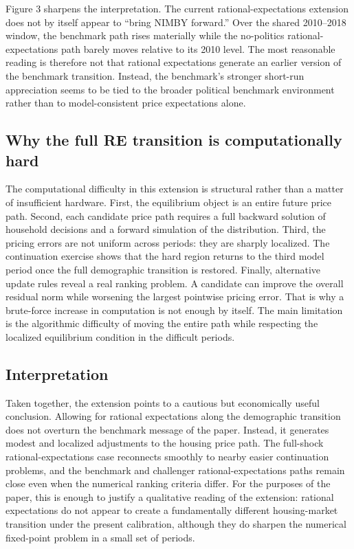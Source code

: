 \documentclass[11pt]{article}
\begin{document}
Figure 3 sharpens the interpretation. The current rational-expectations extension does not by
itself appear to ``bring NIMBY forward.'' Over the shared 2010--2018 window, the benchmark path
rises materially while the no-politics rational-expectations path barely moves relative to its 2010
level. The most reasonable reading is therefore not that rational expectations generate an earlier
version of the benchmark transition. Instead, the benchmark's stronger short-run appreciation seems
to be tied to the broader political benchmark environment rather than to model-consistent price
expectations alone.

\subsection*{Why the full RE transition is computationally hard}

The computational difficulty in this extension is structural rather than a matter of insufficient
hardware. First, the equilibrium object is an entire future price path. Second, each candidate
price path requires a full backward solution of household decisions and a forward simulation of the
distribution. Third, the pricing errors are not uniform across periods: they are sharply localized.
The continuation exercise shows that the hard region returns to the third model period once the full
demographic transition is restored. Finally, alternative update rules reveal a real ranking
problem. A candidate can improve the overall residual norm while worsening the largest pointwise
pricing error. That is why a brute-force increase in computation is not enough by itself. The main
limitation is the algorithmic difficulty of moving the entire path while respecting the localized
equilibrium condition in the difficult periods.

\subsection*{Interpretation}

Taken together, the extension points to a cautious but economically useful conclusion. Allowing for
rational expectations along the demographic transition does not overturn the benchmark message of
the paper. Instead, it generates modest and localized adjustments to the housing price path. The
full-shock rational-expectations case reconnects smoothly to nearby easier continuation problems,
and the benchmark and challenger rational-expectations paths remain close even when the numerical
ranking criteria differ. For the purposes of the paper, this is enough to justify a qualitative
reading of the extension: rational expectations do not appear to create a fundamentally different
housing-market transition under the present calibration, although they do sharpen the numerical
fixed-point problem in a small set of periods.
\end{document}
